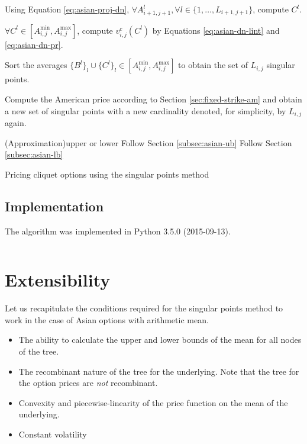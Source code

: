 \begin{algorithm}[H]
{{{				Using Equation \ref{eq:asian-proj-dn}, $\forall A_{i+1,j+1}^l, \forall l \in \{ 1, \dots, L_{i+1,j+1} \} $, compute $ C^l $. \;
				
				$ \forall C^l \in \left[  A_{i,j}^{\min}, A_{i,j}^{\max}  \right] $, compute $ v_{i,j}^c ( C^l ) $ by Equations \ref{eq:asian-dn-lint} and \ref{eq:asian-dn-pr}. \;
				
				Sort the averages $ \{ B^l \}_l \cup \{ C^l \}_l \in \left[  A_{i,j}^{\min}, A_{i,j}^{\max}  \right] $ to obtain the set of $ L_{i,j} $ singular points. \;
				
				Compute the American price according to Section \ref{sec:fixed-strike-am} and obtain a new set of singular points with a new cardinality denoted, for simplicity, by $ L_{i,j} $ again. \;
				
				\Switch(Approximation){upper or lower}{
					 {Follow Section \ref{subsec:asian-ub} \;}
					 {Follow Section \ref{subsec:asian-lb} \;}
				}
			}
		}
	}
	
	\caption{Pricing cliquet options using the singular points method}
\end{algorithm}


\clearpage
\subsection{Implementation}
The algorithm was implemented in Python 3.5.0 (2015-09-13).

\inputminted[tabsize=2]{python}{../code/asian.py}
\label{lst:asian}


\clearpage
\section{Extensibility}
\label{sec:asian-extensions}

Let us recapitulate the conditions required for the singular points method to work in the case of Asian options with arithmetic mean.
\begin{itemize}
	\item The ability to calculate the upper and lower bounds of the mean for all nodes of the tree.
	\item The recombinant nature of the tree for the underlying. Note that the tree for the option prices are \emph{not} recombinant.
	\item Convexity and piecewise-linearity of the price function on the mean of the underlying.
	\item Constant volatility
\end{itemize}

